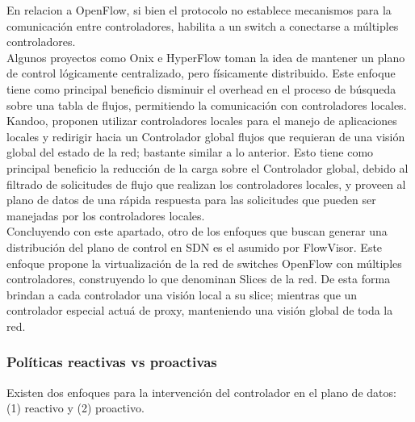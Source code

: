 En relacion a OpenFlow, si bien el protocolo no establece mecanismos para la comunicación entre controladores, habilita a un switch a conectarse a múltiples controladores.\\

Algunos proyectos como Onix\cite{koponen2014distributed} e HyperFlow\cite{tootoonchian2010hyperflow} toman la idea de mantener un plano de control lógicamente centralizado, pero físicamente distribuido. Este enfoque tiene como principal beneficio disminuir el overhead en el proceso de búsqueda sobre una tabla de flujos, permitiendo la comunicación con controladores locales.\\

Kandoo\cite{hassas2012kandoo}, proponen utilizar controladores locales para el manejo de aplicaciones locales y redirigir hacia un Controlador global flujos que requieran de una visión global del estado de la red; bastante similar a lo anterior. Esto tiene como principal beneficio la reducción de la carga sobre el Controlador global, debido al filtrado de solicitudes de flujo que realizan los controladores locales, y proveen al plano de datos de una rápida respuesta para las solicitudes que pueden ser manejadas por los controladores locales.\\

Concluyendo con este apartado, otro de los enfoques que buscan generar una distribución del plano de control en SDN es el asumido por FlowVisor\cite{sherwood2010carving}. Este enfoque propone la virtualización de la red de switches OpenFlow con múltiples controladores, construyendo lo que denominan Slices de la red. De esta forma brindan a cada controlador una visión local a su slice; mientras que un controlador especial actuá de proxy, manteniendo una visión global de toda la red.

\subsubsection{Políticas reactivas vs proactivas}
Existen dos enfoques para la intervención del controlador en el plano de datos: (1) reactivo y (2) proactivo.

